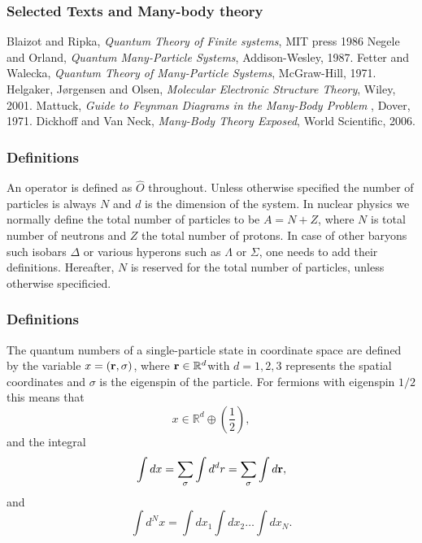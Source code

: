 \documentclass[compress]{beamer}
\begin{document}
\frame
{
  \frametitle<presentation>{Selected Texts and Many-body theory}
 \begin{small}
 {\scriptsize

  \beamertemplatebookbibitems

  \begin{thebibliography}{10}
    Blaizot and Ripka, {\em Quantum Theory of Finite systems}, MIT press 1986
    Negele and Orland, {\em Quantum Many-Particle Systems}, Addison-Wesley, 1987.
    Fetter and Walecka, {\em Quantum Theory of Many-Particle Systems}, McGraw-Hill, 1971.
    Helgaker, J\o rgensen and Olsen, {\em Molecular Electronic Structure Theory}, Wiley, 2001.
    Mattuck, {\em Guide to Feynman Diagrams in the Many-Body Problem }, Dover, 1971.
    Dickhoff and Van Neck, {\em Many-Body Theory Exposed}, World Scientific, 2006.

\end{thebibliography}
 }
 \end{small}
}




\frame
{
\frametitle{Definitions}
An operator is defined as $\hat{O}$ throughout. Unless otherwise
specified the number of particles is always $N$ and $d$ is the dimension of the 
system. 
In nuclear physics we normally define the total number of particles to be $A=N+Z$,
where $N$ is total number of neutrons and $Z$ the total number of protons. In case of other baryons such isobars $\Delta$ or
various hyperons such as $\Lambda$ or $\Sigma$, one needs to add their definitions.  
%
Hereafter, $N$ is reserved for the total number of particles, unless otherwise specificied.
}



\frame
{
\frametitle{Definitions}
The quantum numbers of a single-particle state in coordinate space are
defined by the variable $x=({\bf r},\sigma)$, where ${\bf r}\in {\mathbb{R}}^{d}$with $d=1,2,3$ represents the spatial coordinates and $\sigma$ is the eigenspin of the particle. For fermions with eigenspin $1/2$ this means that
\[
 x\in {\mathbb{R}}^{d}\oplus (\frac{1}{2}),
\]
and the integral
\[
\int dx = \sum_{\sigma}\int d^dr = \sum_{\sigma}\int d{\bf r},
\]
and
\[
\int d^Nx= \int dx_1\int dx_2\dots\int dx_N.
\]

}
\end{document}
